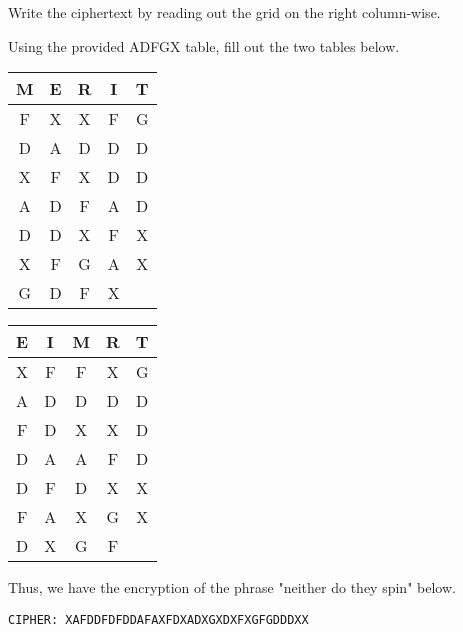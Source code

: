 \documentclass[../hw_sols.tex]{subfiles}
\begin{document}
Write the ciphertext by reading out the grid on the right 
column-wise.

\begin{solution}

Using the provided ADFGX table, fill out the two tables below.
\begin{center}
\begin{tabular}{ || c | c | c | c | c || }
	\hline
	\textbf{M} & \textbf{E} & \textbf{R} & \textbf{I} & \textbf{T} \\
	\hline
	F & X & X & F & G \\
	\hline
	D & A & D & D & D \\
	\hline
	X & F & X & D & D \\
	\hline
	A & D & F & A & D \\
	\hline
	D & D & X & F & X \\
	\hline
	X & F & G & A & X \\
	\hline
	G & D & F & X & \\
	\hline
\end{tabular}
\qquad {\Huge $\Rightarrow$} \qquad
\begin{tabular}{ || c | c | c | c | c || }
	\hline
	\textbf{E} & \textbf{I} & \textbf{M} & \textbf{R} & \textbf{T} \\
	\hline
	X & F & F & X & G \\
	\hline
	A & D & D & D & D \\
	\hline
	F & D & X & X & D \\
	\hline
	D & A & A & F & D \\
	\hline
	D & F & D & X & X \\
	\hline
	F & A & X & G & X \\
	\hline
	D & X & G & F & \\
	\hline
\end{tabular}
\end{center}

Thus, we have the encryption of the phrase "neither do they spin" below.
\begin{Verbatim}
CIPHER: XAFDDFDFDDAFAXFDXADXGXDXFXGFGDDDXX
\end{Verbatim}

\end{solution}


\newpage


\end{document}
